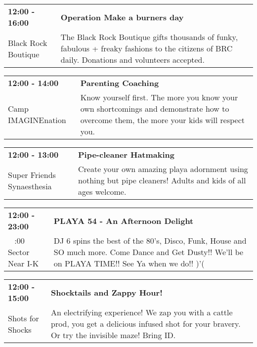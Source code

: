 \begin{tabular}{ p{1in} p{2.2in} }
    \textbf{12:00 - 16:00} & \textbf{Operation Make a burners day} \\
    Black Rock Boutique \newline  & The Black Rock Boutique gifts thousands of funky, fabulous + freaky fashions to the citizens of BRC daily.  Donations and volunteers accepted. \\
    \hline 
\end{tabular}
    
\begin{tabular}{ p{1in} p{2.2in} }
    \textbf{12:00 - 14:00} & \textbf{Parenting Coaching} \\
    Camp IMAGINEnation \newline  & Know yourself first. The more you know your own shortcomings and demonstrate how to overcome them, the more your kids will respect you. \\
    \hline 
\end{tabular}
    
\begin{tabular}{ p{1in} p{2.2in} }
    \textbf{12:00 - 13:00} & \textbf{Pipe-cleaner Hatmaking} \\
    Super Friends Synaesthesia \newline  & Create your own amazing playa adornment using nothing but pipe cleaners! Adults and kids of all ages welcome. \\
    \hline 
\end{tabular}
    
\begin{tabular}{ p{1in} p{2.2in} }
    \textbf{12:00 - 23:00} & \textbf{PLAYA 54 - An Afternoon Delight} \\
    ~ \newline 9:00 Sector Near I-K & DJ 6 spins the best of the 80's, Disco, Funk, House and SO much more. Come Dance and Get Dusty!! We'll be on PLAYA TIME!! See Ya when we do!! )'( \\
    \hline 
\end{tabular}
    
\begin{tabular}{ p{1in} p{2.2in} }
    \textbf{12:00 - 15:00} & \textbf{Shocktails and Zappy Hour! } \\
    Shots for Shocks \newline  & An electrifying experience! We zap you with a cattle prod, you get a delicious infused shot for your bravery. Or try the invisible maze! Bring ID. \\
    \hline 
\end{tabular}
    
